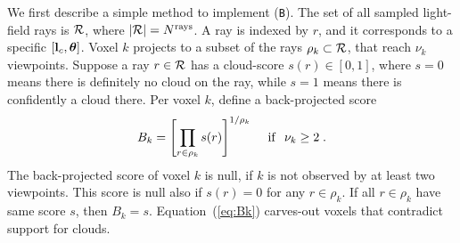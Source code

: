 \documentclass[runningheads]{llncs}
\begin{document}
We first describe a simple method to implement ({\tt B}).  The set of all sampled light-field rays is ${\cal R}$, where
\mbox{$|{\cal R}|=N^{\rm rays}$}. A ray is indexed by $r$, and it corresponds to a specific $[{\bf l}_c,{\bm \theta}]$. Voxel $k$ projects to a subset of the rays $\rho_k\subset{\cal R}$,
that reach $\nu_k$ viewpoints. Suppose a ray $r\in{\cal R}$ has a cloud-score $s(r)\in[0,1]$, where \mbox{$s=0$} means there is definitely no cloud on the ray, while \mbox{$s=1$} means there is confidently a cloud there. Per voxel $k$, define a back-projected score
\begin{equation}
 B_k= \left[ \prod_{r\in\rho_k} s(r)\right]^{1/\rho_k}
 \;\; ~~{\rm if}~~ \nu_k\geq 2
  \;.
 \label{eq:Bk}
\end{equation}
The back-projected score of voxel $k$ is null, if $k$ is not observed by at least two viewpoints. This score is null also if $s(r)=0$ for any $r\in\rho_k$. If all $r\in\rho_k$ have same score $s$, then $B_k=s$. Equation~(\ref{eq:Bk}) carves-out voxels that contradict support for clouds.
\end{document}
